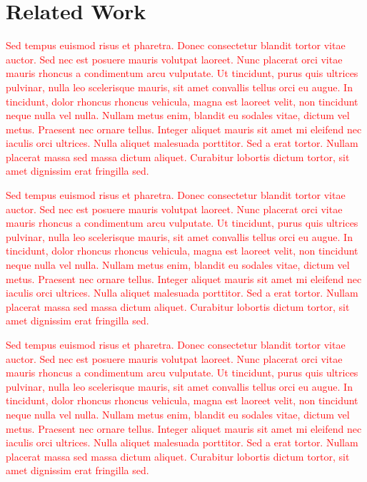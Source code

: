 \documentclass[11pt,letterpaper]{article}
\newcommand{\note}[1]{\textcolor{red}{#1}}
\begin{document}
\section{Related Work}


\note{Sed tempus euismod risus et pharetra. Donec consectetur blandit tortor vitae auctor. Sed nec est posuere mauris volutpat laoreet. Nunc placerat orci vitae mauris rhoncus a condimentum arcu vulputate. Ut tincidunt, purus quis ultrices pulvinar, nulla leo scelerisque mauris, sit amet convallis tellus orci eu augue. In tincidunt, dolor rhoncus rhoncus vehicula, magna est laoreet velit, non tincidunt neque nulla vel nulla. Nullam metus enim, blandit eu sodales vitae, dictum vel metus. Praesent nec ornare tellus. Integer aliquet mauris sit amet mi eleifend nec iaculis orci ultrices. Nulla aliquet malesuada porttitor. Sed a erat tortor. Nullam placerat massa sed massa dictum aliquet. Curabitur lobortis dictum tortor, sit amet dignissim erat fringilla sed.}

\note{Sed tempus euismod risus et pharetra. Donec consectetur blandit tortor vitae auctor. Sed nec est posuere mauris volutpat laoreet. Nunc placerat orci vitae mauris rhoncus a condimentum arcu vulputate. Ut tincidunt, purus quis ultrices pulvinar, nulla leo scelerisque mauris, sit amet convallis tellus orci eu augue. In tincidunt, dolor rhoncus rhoncus vehicula, magna est laoreet velit, non tincidunt neque nulla vel nulla. Nullam metus enim, blandit eu sodales vitae, dictum vel metus. Praesent nec ornare tellus. Integer aliquet mauris sit amet mi eleifend nec iaculis orci ultrices. Nulla aliquet malesuada porttitor. Sed a erat tortor. Nullam placerat massa sed massa dictum aliquet. Curabitur lobortis dictum tortor, sit amet dignissim erat fringilla sed.}

\note{Sed tempus euismod risus et pharetra. Donec consectetur blandit tortor vitae auctor. Sed nec est posuere mauris volutpat laoreet. Nunc placerat orci vitae mauris rhoncus a condimentum arcu vulputate. Ut tincidunt, purus quis ultrices pulvinar, nulla leo scelerisque mauris, sit amet convallis tellus orci eu augue. In tincidunt, dolor rhoncus rhoncus vehicula, magna est laoreet velit, non tincidunt neque nulla vel nulla. Nullam metus enim, blandit eu sodales vitae, dictum vel metus. Praesent nec ornare tellus. Integer aliquet mauris sit amet mi eleifend nec iaculis orci ultrices. Nulla aliquet malesuada porttitor. Sed a erat tortor. Nullam placerat massa sed massa dictum aliquet. Curabitur lobortis dictum tortor, sit amet dignissim erat fringilla sed.}
\end{document}
